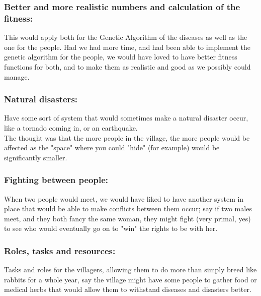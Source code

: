 \documentclass[conference,compsoc]{IEEEtran}
\begin{document}
\subsubsection*{Better and more realistic numbers and calculation of the fitness:}
This would apply both for the Genetic Algorithm of the diseases as well as the one for the people. Had we had more time, and had been able to implement the genetic algorithm for the people, we would have loved to have better fitness functions for both, and to make them as realistic and good as we possibly could manage.\\

\subsubsection*{Natural disasters:}
Have some sort of system that would sometimes make a natural disaster occur, like a tornado coming in, or an earthquake.\\
The thought was that the more people in the village, the more people would be affected as the "space" where you could "hide" (for example) would be significantly smaller.\\

\subsubsection*{Fighting between people:}
When two people would meet, we would have liked to have another system in place that would be able to make conflicts between them occur; say if two males meet, and they both fancy the same woman, they might fight (very primal, yes) to see who would eventually go on to "win" the rights to be with her.\\

\subsubsection*{Roles, tasks and resources:}
Tasks and roles for the villagers, allowing them to do more than simply breed like rabbits for a whole year, say the village might have some people to gather food or medical herbs that would allow them to withstand diseases and disasters better.\\

\end{document}
